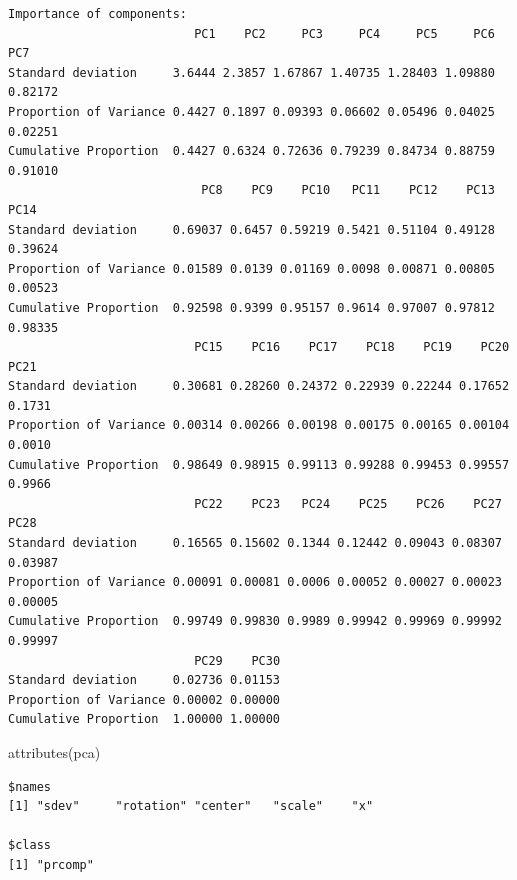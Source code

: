 \documentclass[
  letterpaper,
  DIV=11,
  numbers=noendperiod]{scrartcl}
\newenvironment{Shaded}{\begin{snugshade}}{\end{snugshade}}
\newcommand{\AttributeTok}[1]{\textcolor[rgb]{0.40,0.45,0.13}{#1}}
\newcommand{\DecValTok}[1]{\textcolor[rgb]{0.68,0.00,0.00}{#1}}
\newcommand{\FunctionTok}[1]{\textcolor[rgb]{0.28,0.35,0.67}{#1}}
\newcommand{\NormalTok}[1]{\textcolor[rgb]{0.00,0.23,0.31}{#1}}
\newcommand{\SpecialCharTok}[1]{\textcolor[rgb]{0.37,0.37,0.37}{#1}}
\begin{document}
\begin{verbatim}
Importance of components:
                          PC1    PC2     PC3     PC4     PC5     PC6     PC7
Standard deviation     3.6444 2.3857 1.67867 1.40735 1.28403 1.09880 0.82172
Proportion of Variance 0.4427 0.1897 0.09393 0.06602 0.05496 0.04025 0.02251
Cumulative Proportion  0.4427 0.6324 0.72636 0.79239 0.84734 0.88759 0.91010
                           PC8    PC9    PC10   PC11    PC12    PC13    PC14
Standard deviation     0.69037 0.6457 0.59219 0.5421 0.51104 0.49128 0.39624
Proportion of Variance 0.01589 0.0139 0.01169 0.0098 0.00871 0.00805 0.00523
Cumulative Proportion  0.92598 0.9399 0.95157 0.9614 0.97007 0.97812 0.98335
                          PC15    PC16    PC17    PC18    PC19    PC20   PC21
Standard deviation     0.30681 0.28260 0.24372 0.22939 0.22244 0.17652 0.1731
Proportion of Variance 0.00314 0.00266 0.00198 0.00175 0.00165 0.00104 0.0010
Cumulative Proportion  0.98649 0.98915 0.99113 0.99288 0.99453 0.99557 0.9966
                          PC22    PC23   PC24    PC25    PC26    PC27    PC28
Standard deviation     0.16565 0.15602 0.1344 0.12442 0.09043 0.08307 0.03987
Proportion of Variance 0.00091 0.00081 0.0006 0.00052 0.00027 0.00023 0.00005
Cumulative Proportion  0.99749 0.99830 0.9989 0.99942 0.99969 0.99992 0.99997
                          PC29    PC30
Standard deviation     0.02736 0.01153
Proportion of Variance 0.00002 0.00000
Cumulative Proportion  1.00000 1.00000
\end{verbatim}

\begin{Shaded}
\begin{Highlighting}[]
\FunctionTok{attributes}\NormalTok{(pca)}
\end{Highlighting}
\end{Shaded}

\begin{verbatim}
$names
[1] "sdev"     "rotation" "center"   "scale"    "x"       

$class
[1] "prcomp"
\end{verbatim}

\begin{Shaded}
\end{Shaded}
\end{document}

